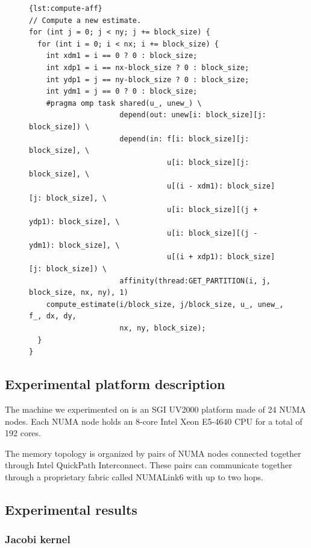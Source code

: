 \documentclass{Styles/llncs}
\begin{document}
\begin{figure}[htbp]
\begin{lstlisting}[caption=Example of use of the affinity clause for computation,frame=tlrb,style=smaller,label=lst:compute-aff]{lst:compute-aff}
// Compute a new estimate.
for (int j = 0; j < ny; j += block_size) {
  for (int i = 0; i < nx; i += block_size) {
    int xdm1 = i == 0 ? 0 : block_size;
    int xdp1 = i == nx-block_size ? 0 : block_size;
    int ydp1 = j == ny-block_size ? 0 : block_size;
    int ydm1 = j == 0 ? 0 : block_size;
    #pragma omp task shared(u_, unew_) \
                     depend(out: unew[i: block_size][j: block_size]) \
                     depend(in: f[i: block_size][j: block_size], \
                                u[i: block_size][j: block_size], \
                                u[(i - xdm1): block_size][j: block_size], \
                                u[i: block_size][(j + ydp1): block_size], \
                                u[i: block_size][(j - ydm1): block_size], \
                                u[(i + xdp1): block_size][j: block_size]) \
                     affinity(thread:GET_PARTITION(i, j, block_size, nx, ny), 1)
    compute_estimate(i/block_size, j/block_size, u_, unew_, f_, dx, dy,
                     nx, ny, block_size);
  }
}
\end{lstlisting}
\end{figure}

\subsection{Experimental platform description}
\label{sec:idchire}

The machine we experimented on is an SGI UV2000 platform made of 24 NUMA nodes.
Each NUMA node holds an 8-core Intel Xeon E5-4640 CPU for a total of 192 cores.

The memory topology is organized by pairs of NUMA nodes connected together through Intel QuickPath Interconnect.
These pairs can communicate together through a proprietary fabric called NUMALink6 with up to two hops.

\subsection{Experimental results}
\label{sec:experiment}

\subsubsection{Jacobi kernel}
\end{document}
